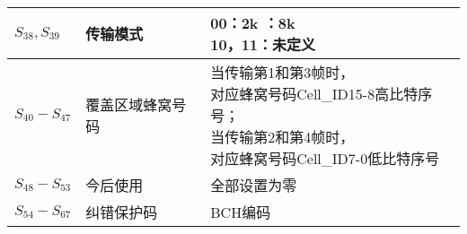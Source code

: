 \begin{table}[!hbp]
\begin{tabular}{|m{2cm}<{\centering}|m{3cm}<{\centering}|m{8cm}<{\centering}|}
	\hline
	$S_{38},S_{39}$ & 传输模式 & \tabincell{c}{00：2k \qquad 01：8k \\ 10，11：未定义} \\
	\hline
	$S_{40}-S_{47}$ & 覆盖区域蜂窝号码 & \tabincell{l}{当传输第1和第3帧时，\\对应蜂窝号码Cell\_ID15-8高比特序号； \\ 当传输第2和第4帧时，\\对应蜂窝号码Cell\_ID7-0低比特序号} \\
	\hline
	$S_{48}-S_{53}$ & 今后使用 & 全部设置为零 \\
	\hline
	$S_{54}-S_{67}$ & 纠错保护码 & BCH编码 \\
	\hline\hline
	\end{tabular}
	\label{table:tps}
\end{table}

\endinput